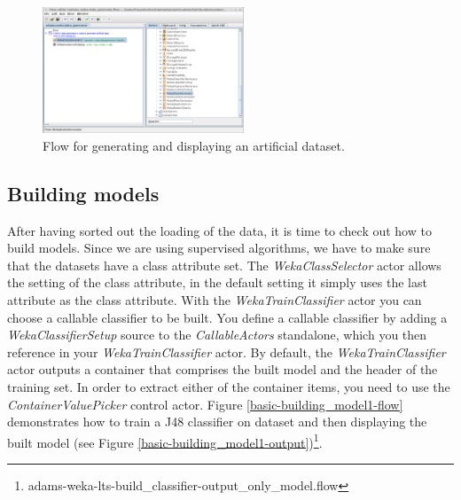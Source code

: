 \begin{figure}[htb]
  \centering
  \includegraphics[width=6.0cm]{images/basic-datagenerator.png}
  \caption{Flow for generating and displaying an artificial dataset.}
  \label{basic-datagenerator}
\end{figure}

\subsection{Building models}
After having sorted out the loading of the data, it is time to check out how to
build models. Since we are using supervised algorithms, we have to make sure
that the datasets have a class attribute set. The \textit{WekaClassSelector}
actor allows the setting of the class attribute, in the default setting it
simply uses the last attribute as the class attribute. With the
\textit{WekaTrainClassifier} actor you can choose a callable classifier to be built. 
You define a callable classifier by adding a \textit{WekaClassifierSetup} source
to the \textit{CallableActors} standalone, which you then reference in your 
\textit{WekaTrainClassifier} actor.
By default, the \textit{WekaTrainClassifier} actor outputs a container that comprises
the built model and the header of the training set. In order to extract either
of the container items, you need to use the \textit{ContainerValuePicker}
control actor. Figure \ref{basic-building_model1-flow} demonstrates how to train
a J48 classifier on dataset and then displaying the built model (see Figure
\ref{basic-building_model1-output})\footnote{adams-weka-lts-build\_classifier-output\_only\_model.flow}.

